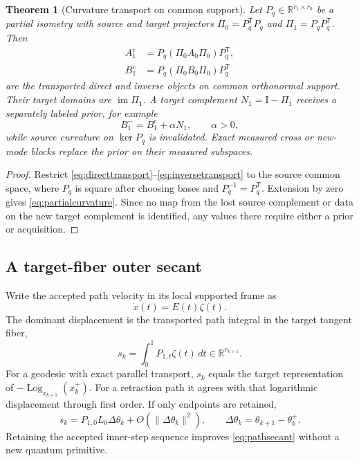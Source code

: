 \documentclass[10pt,twocolumn]{article}
\newtheorem{theorem}{Theorem}[section]
\theoremstyle{definition}
\theoremstyle{remark}
\newcommand{\R}{\mathbb R}
\newcommand{\Id}{\mathrm I}
\newcommand{\im}{\operatorname{im}}
\newcommand{\Log}{\operatorname{Log}}
\begin{document}
\begin{theorem}[Curvature transport on common support]
Let $P_q\in\R^{r_1\times r_0}$ be a partial isometry with source and target projectors $\Pi_0=P_q^{\mathsf T}P_q$ and $\Pi_1=P_qP_q^{\mathsf T}$.  Then
\begin{align}
 A_1^{c}&=P_q(\Pi_0A_0\Pi_0)P_q^{\mathsf T},\nonumber\\
 B_1^{c}&=P_q(\Pi_0B_0\Pi_0)P_q^{\mathsf T}
 \label{eq:partialcurvature}
\end{align}
are the transported direct and inverse objects on common orthonormal support.  Their target domains are $\im\Pi_1$.  A target complement $N_1=\Id-\Pi_1$ receives a separately labeled prior, for example
\begin{equation}
 B_1^-=B_1^c+\alpha N_1,\qquad \alpha>0,
 \label{eq:newmodeprior}
\end{equation}
while source curvature on $\ker P_q$ is invalidated.  Exact measured cross or new-mode blocks replace the prior on their measured subspaces.
\end{theorem}

\begin{proof}
Restrict \eqref{eq:directtransport}--\eqref{eq:inversetransport} to the source common space, where $P_q$ is square after choosing bases and $P_q^{-1}=P_q^{\mathsf T}$.  Extension by zero gives \eqref{eq:partialcurvature}.  Since no map from the lost source complement or data on the new target complement is identified, any values there require either a prior or acquisition.
\end{proof}

\subsection{A target-fiber outer secant}

Write the accepted path velocity in its local supported frame as
\begin{equation}
 \dot x(t)=E(t)\zeta(t).
 \label{eq:pathvelocity}
\end{equation}
The dominant displacement is the transported path integral in the target tangent fiber,
\begin{equation}
 s_k=\int_0^1P_{1,t}\zeta(t)\,dt\in\R^{r_{k+1}}.
 \label{eq:pathsecant}
\end{equation}
For a geodesic with exact parallel transport, $s_k$ equals the target representation of $-\Log_{x_{k+1}}(x_k^+)$.  For a retraction path it agrees with that logarithmic displacement through first order.  If only endpoints are retained,
\begin{equation}
 s_k=P_{1,0}L_0\Delta\theta_k+O(\|\Delta\theta_k\|^2),
 \qquad \Delta\theta_k=\theta_{k+1}-\theta_k^+.
 \label{eq:endpointsecant}
\end{equation}
Retaining the accepted inner-step sequence improves \eqref{eq:pathsecant} without a new quantum primitive.
\end{document}
